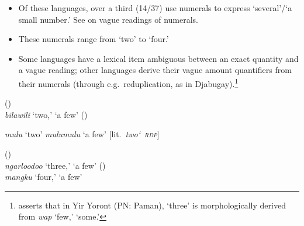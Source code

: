 \documentclass{article}
\begin{document}
\begin{itemize}
\item Of these languages, over a third (14/37) use numerals to express `several'/`a small number.' See \citet[\S3.3.1]{bowernzentz12} on vague readings of numerals.
\item These numerals range from `two'  to `four.'
\item Some languages have a lexical item ambiguous between an exact quantity and a vague reading; other languages derive their vague amount quantifiers from their numerals (through e.g.\ reduplication, as in Djabugay).\footnote{\citet[51]{alpher73} asserts that in Yir Yoront (PN: Paman), \textit{} `three' is morphologically derived from \textit{wap} `few,' `some.'}
\end{itemize}
\begin{exe}
   (\citealt[9]{waters83})\\
  {\it bilawili} `two,' `a few'
   (\citealt[87]{patz91})
  \begin{xlist}
    \ex \textit{mulu} `two'
    \ex \textit{mulumulu} `a few' [lit.\ \textit{two\char`~\textsc{rdp}}]
  \end{xlist}
   (\citealt[149]{mcgregor90})\\
  \textit{ngarloodoo} `three,' `a few'
   (\citealt[27,82]{thompson88})\\
  {\it mangku} `four,' `a few'
\end{exe}
\end{document}
